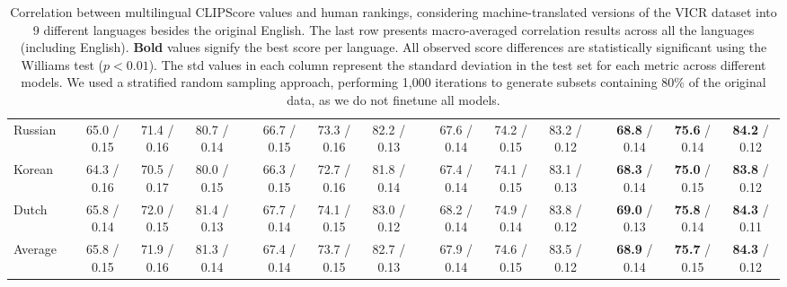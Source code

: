 \begin{table*}[t!]
{\begin{tabular}{l c c c   c   c c c   c   c c c   c   c c c }
Russian     &65.0 / 0.15 & 71.4 / 0.16 & 80.7 / 0.14&  &66.7 / 0.15 & 73.3 / 0.16 & 82.2 / 0.13&   &67.6 / 0.14 & 74.2 / 0.15 & 83.2 / 0.12&  &\textbf{68.8} / 0.14 & \textbf{75.6} / 0.14 & \textbf{84.2} / 0.12\\
Korean      &64.3 / 0.16 & 70.5 / 0.17 & 80.0 / 0.15&  &66.3 / 0.15 & 72.7 / 0.16 & 81.8 / 0.14&   &67.4 / 0.14 & 74.1 / 0.15 & 83.1 / 0.13&  &\textbf{68.3} / 0.14 & \textbf{75.0} / 0.15 & \textbf{83.8} / 0.12\\
Dutch       &65.8 / 0.14 & 72.0 / 0.15 & 81.4 / 0.13&  &67.7 / 0.14 & 74.1 / 0.15 & 83.0 / 0.12&   &68.2 / 0.14 & 74.9 / 0.14 & 83.8 / 0.12&  &\textbf{69.0} / 0.13 & \textbf{75.8} / 0.14 & \textbf{84.3} / 0.11\\ \hline 
Average~~   &65.8 / 0.15 & 71.9 / 0.16 & 81.3 / 0.14&  &67.4 / 0.14 & 73.7 / 0.15 & 82.7 / 0.13&   &67.9 / 0.14 & 74.6 / 0.15 & 83.5 / 0.12&  &\textbf{68.9} / 0.14 & \textbf{75.7} / 0.15 & \textbf{84.3} / 0.12\\
\hline 
\end{tabular}
}
\vspace{-0.25cm}
\caption{Correlation between multilingual CLIPScore values and human rankings, considering machine-translated versions of the VICR dataset into 9 different languages besides the original English. The last row presents macro-averaged correlation results across all the languages (including English). \textbf{Bold} values signify the best score per language. All observed score differences are statistically significant using the Williams test ($p < 0.01$). The std
values in each column represent the standard deviation in the test set for each metric across different models.  We used a stratified random sampling approach, performing 1,000 iterations to generate subsets containing 80\% of the original data, as we do not finetune all models.}
\label{tab:multilingual-results}
\vspace{-0.25cm}
\end{table*}


